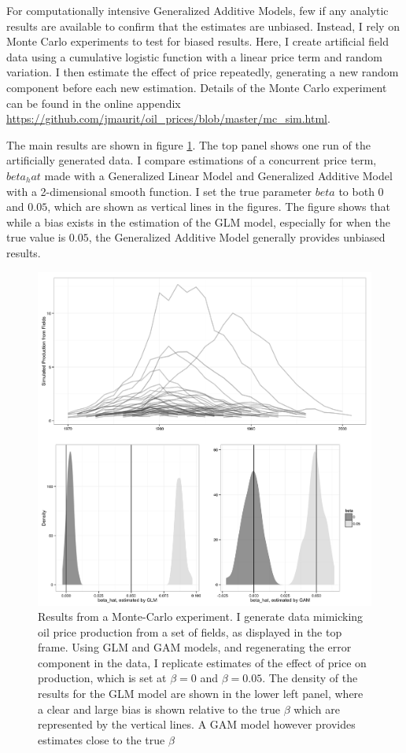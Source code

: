 \documentclass[11pt]{article}
\begin{document}
For computationally intensive Generalized Additive Models, few if any analytic results are available to confirm that the estimates are unbiased.  Instead, I rely on Monte Carlo experiments to test for biased results.  Here, I create artificial field data using a cumulative logistic function with a linear price term and random variation. I then estimate the effect of price repeatedly, generating a new random component before each new estimation. Details of the Monte Carlo experiment can be found in the online appendix \url{https://github.com/jmaurit/oil_prices/blob/master/mc_sim.html}.  

The main results are shown in figure \ref{mc_results}.  The top panel shows one run of the artificially generated data. I compare estimations of a concurrent price term, $beta_hat$ made with a Generalized Linear Model and Generalized Additive Model with a 2-dimensional smooth function.  I set the true parameter $beta$ to both $0$ and $0.05$, which are shown as vertical lines in the figures.  The figure shows that while a bias exists in the estimation of the GLM model, especially for when the true value is $0.05$, the Generalized Additive Model generally provides unbiased results. 

\begin{figure}
	\includegraphics[width=1\textwidth]{figures/mc_plot.png}
	\caption{Results from a Monte-Carlo experiment. I generate data mimicking oil price production from a set of fields, as displayed in the top frame. Using GLM and GAM models, and regenerating the error component in the data, I replicate estimates of the effect of price on production, which is set at $\beta = 0$ and $\beta=0.05$. The density of the results for the GLM model are shown in the lower left panel, where a clear and large bias is shown relative to the true $\beta$ which are represented by the vertical lines.  A GAM model however provides estimates close to the true $\beta$}
	\label{mc_results}
\end{figure}
\end{document}
